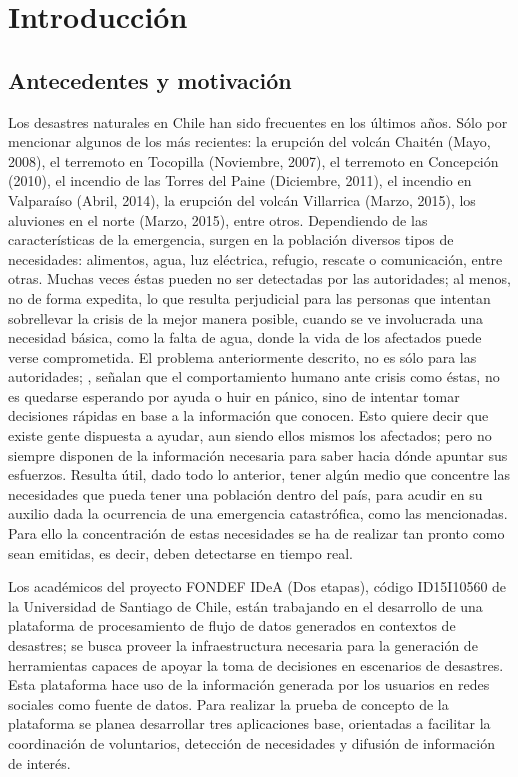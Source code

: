 \chapter{Introducción}
\label{cap:introduccion}

\section{Antecedentes y motivación}
\label{intro:motivacion}

Los desastres naturales en Chile han sido frecuentes en los últimos años. Sólo por mencionar algunos de los más recientes: la erupción del volcán Chaitén (Mayo, 2008), el terremoto en Tocopilla (Noviembre, 2007), el terremoto en Concepción (2010), el incendio de las Torres del Paine (Diciembre, 2011), el incendio en Valparaíso (Abril, 2014), la erupción del volcán Villarrica (Marzo, 2015), los aluviones en el norte (Marzo, 2015), entre otros. Dependiendo de las características de la emergencia, surgen en la población diversos tipos de necesidades: alimentos, agua, luz eléctrica, refugio, rescate o comunicación, entre otras. Muchas veces éstas pueden no ser detectadas por las autoridades; al menos, no de forma expedita, lo que resulta perjudicial para las personas que intentan sobrellevar la crisis de la mejor manera posible, cuando se ve involucrada una necesidad básica, como la falta de agua, donde la vida de los afectados puede verse comprometida. El problema anteriormente descrito, no es sólo para las autoridades; \citep{ChatoSurvey}, señalan que el comportamiento humano ante crisis como éstas, no es quedarse esperando por ayuda o huir en pánico, sino de intentar tomar decisiones rápidas en base a la información que conocen. Esto quiere decir que existe gente dispuesta a ayudar, aun siendo ellos mismos los afectados; pero no siempre disponen de la información necesaria para saber hacia dónde apuntar sus esfuerzos. Resulta útil, dado todo lo anterior, tener algún medio que concentre las necesidades que pueda tener una población dentro del país, para acudir en su auxilio dada la ocurrencia de una emergencia catastrófica, como las mencionadas. Para ello la concentración de estas necesidades se ha de realizar tan pronto como sean emitidas, es decir, deben detectarse en tiempo real.

Los académicos del proyecto FONDEF IDeA (Dos etapas), código ID15I10560 de la Universidad de Santiago de Chile, están trabajando en el desarrollo de una plataforma de procesamiento de flujo de datos generados en contextos de desastres; se busca proveer la infraestructura necesaria para la generación de herramientas capaces de apoyar la toma de decisiones en escenarios de desastres. Esta plataforma hace uso de la información generada por los usuarios en redes sociales como fuente de datos. Para realizar la prueba de concepto de la plataforma se planea desarrollar tres aplicaciones base, orientadas a facilitar la coordinación de voluntarios, detección de necesidades y difusión de información de interés.

